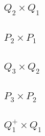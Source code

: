 \subsection*{$Q_2\times Q_1$}

\subsection*{$P_2\times P_1$}

\subsection*{$Q_3\times Q_2$}

\subsection*{$P_3\times P_2$}

\newpage
\subsection*{$Q_1^+\times Q_1$}

